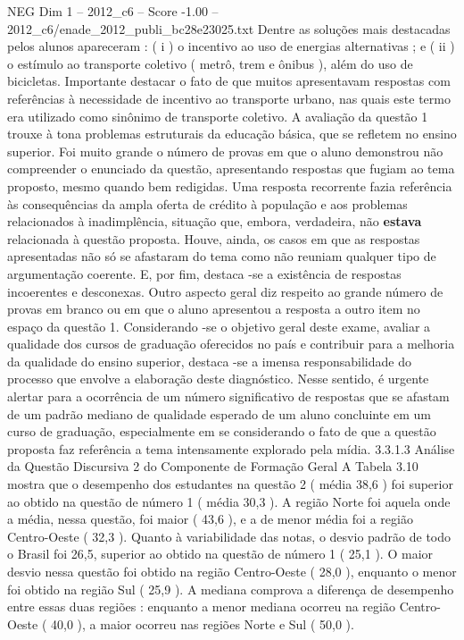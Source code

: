 \begin{textsample}{NEG Dim 1 – 2012\_c6 – Score -1.00 – 2012\_c6/enade\_2012\_publi\_bc28e23025.txt}
Dentre as soluções mais destacadas pelos alunos apareceram : ( i ) o incentivo ao uso de energias alternativas ; e ( ii ) o estímulo ao transporte coletivo ( metrô, trem e ônibus ), além do uso de bicicletas.
Importante destacar o fato de que muitos apresentavam respostas com referências à necessidade de incentivo ao transporte urbano, nas quais este termo era utilizado como sinônimo de transporte coletivo.
A avaliação da questão 1 trouxe à tona problemas estruturais da educação básica, que se refletem no ensino superior.
Foi muito grande o número de provas em que o aluno demonstrou não compreender o enunciado da questão, apresentando respostas que fugiam ao tema proposto, mesmo quando bem redigidas.
Uma resposta recorrente fazia referência às consequências da ampla oferta de crédito à população e aos problemas relacionados à inadimplência, situação que, embora, verdadeira, não \textbf{estava} relacionada à questão proposta.
Houve, ainda, os casos em que as respostas apresentadas não só se afastaram do tema como não reuniam qualquer tipo de argumentação coerente.
E, por fim, destaca -se a existência de respostas incoerentes e desconexas.
Outro aspecto geral diz respeito ao grande número de provas em branco ou em que o aluno apresentou a resposta a outro item no espaço da questão 1.
Considerando -se o objetivo geral deste exame, avaliar a qualidade dos cursos de graduação oferecidos no país e contribuir para a melhoria da qualidade do ensino superior, destaca -se a imensa responsabilidade do processo que envolve a elaboração deste diagnóstico.
Nesse sentido, é urgente alertar para a ocorrência de um número significativo de respostas que se afastam de um padrão mediano de qualidade esperado de um aluno concluinte em um curso de graduação, especialmente em se considerando o fato de que a questão proposta faz referência a tema intensamente explorado pela mídia. 3.3.1.3 Análise da Questão Discursiva 2 do Componente de Formação Geral A Tabela 3.10 mostra que o desempenho dos estudantes na questão 2 ( média 38,6 ) foi superior ao obtido na questão de número 1 ( média 30,3 ).
A região Norte foi aquela onde a média, nessa questão, foi maior ( 43,6 ), e a de menor média foi a região Centro-Oeste ( 32,3 ).
Quanto à variabilidade das notas, o desvio padrão de todo o Brasil foi 26,5, superior ao obtido na questão de número 1 ( 25,1 ).
O maior desvio nessa questão foi obtido na região Centro-Oeste ( 28,0 ), enquanto o menor foi obtido na região Sul ( 25,9 ).
A mediana comprova a diferença de desempenho entre essas duas regiões : enquanto a menor mediana ocorreu na região Centro-Oeste ( 40,0 ), a maior ocorreu nas regiões Norte e Sul ( 50,0 ).

\end{textsample}
